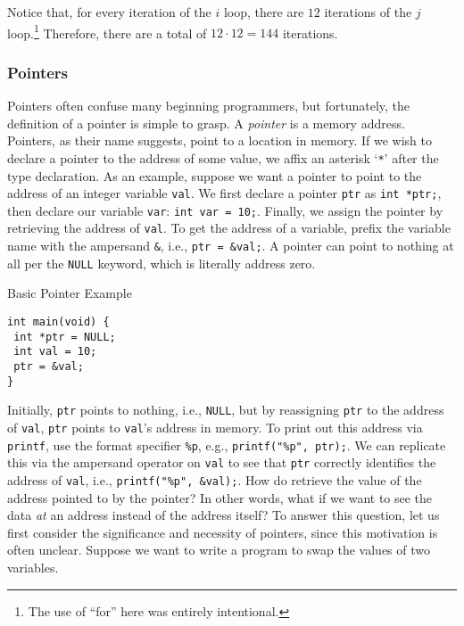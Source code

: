 Notice that, for every iteration of the $i$ loop, there are $12$ iterations of the $j$ loop.\footnote{The use of ``for'' here was entirely intentional.} Therefore, there are a total of $12 \cdot 12 = 144$ iterations. 


\subsubsection*{Pointers}

Pointers often confuse many beginning programmers, but fortunately, the definition of a pointer is simple to grasp. A \textit{pointer} is a memory address. Pointers, as their name suggests, point to a location in memory. If we wish to declare a pointer to the address of some value, we affix an asterisk `\texttt{*}' after the type declaration. As an example, suppose we want a pointer to point to the address of an integer variable \texttt{val}. We first declare a pointer \texttt{ptr} as \texttt{int *ptr;}, then declare our variable \texttt{var}: \texttt{int var = 10;}. Finally, we assign the pointer by retrieving the address of \texttt{val}. To get the address of a variable, prefix the variable name with the ampersand \texttt{\&}, i.e., \texttt{ptr = \&val;}. A pointer can point to nothing at all per the \texttt{NULL} keyword, which is literally address zero.

\begin{cl}[main.c]{Basic Pointer Example}
\begin{lstlisting}[language=MyC]
int main(void) {
 int *ptr = NULL;
 int val = 10;
 ptr = &val;
}
\end{lstlisting}
\end{cl}

Initially, \texttt{ptr} points to nothing, i.e., \texttt{NULL}, but by reassigning \texttt{ptr} to the address of \texttt{val}, \texttt{ptr} points to \texttt{val}'s address in memory. To print out this address via \texttt{printf}, use the format specifier \texttt{\%p}, e.g., \texttt{printf("\%p", ptr);}. We can replicate this via the ampersand operator on \texttt{val} to see that \texttt{ptr} correctly identifies the address of \texttt{val}, i.e., \texttt{printf("\%p", \&val);}. How do retrieve the value of the address pointed to by the pointer? In other words, what if we want to see the data \textit{at} an address instead of the address itself? To answer this question, let us first consider the significance and necessity of pointers, since this motivation is often unclear. Suppose we want to write a program to swap the values of two variables.


